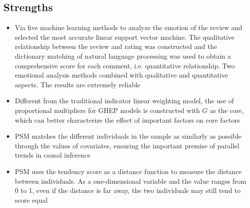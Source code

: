 \documentclass{mcmthesis}
\begin{document}
\subsection{Strengths}
\begin{itemize}
\item 
Via five machine learning methods to analyze the emotion of the review and selected the most accurate linear support vector machine. The qualitative relationship between the review and rating was constructed and the dictionary matching of natural language processing was used to obtain a comprehensive score for each comment, i.e. quantitative relationship. Two emotional analysis methods combined with qualitative and quantitative  aspects. The results are extremely reliable
\item 
Different from the traditional indicator linear weighting model, the use of proportional multipliers for GHEP models is constructed with $ G $ as the core, which can better characterize the effect of important factors on core factors
\item
PSM matches the different individuals in the sample as similarly as possible through the values of covariates, ensuring the important premise of parallel trends in causal inference
\item 
PSM uses the tendency score as a distance function to measure the distance between individuals. As a one-dimensional variable and the value ranges from 0 to 1, even if the distance is far away, the two individuals may still tend to score equal
\end{itemize}
\end{document}
